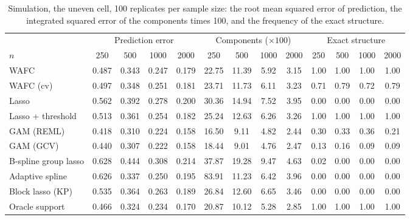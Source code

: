 \begin{table}[tp]
\color{colR1}
\caption{Simulation, the uneven cell, 100 replicates per sample size: the root mean squared error of prediction, the integrated squared error of the components times 100, and the frequency of the exact structure.}
\label{tab:sim-sizes-uneven}
\centering
\footnotesize
\setlength{\tabcolsep}{3pt}
\begin{tabular}{l cccc cccc cccc}
\hline
 & \multicolumn{4}{c}{Prediction error} & \multicolumn{4}{c}{Components ($\times 100$)} & \multicolumn{4}{c}{Exact structure} \\
$n$ & 250 & 500 & 1000 & 2000 & 250 & 500 & 1000 & 2000 & 250 & 500 & 1000 & 2000 \\
\hline
WAFC & 0.487 & 0.343 & 0.247 & 0.179 & 22.75 & 11.39 & 5.92 & 3.15 & 1.00 & 1.00 & 1.00 & 1.00 \\
WAFC (cv) & 0.497 & 0.348 & 0.251 & 0.181 & 23.71 & 11.73 & 6.11 & 3.23 & 0.71 & 0.79 & 0.72 & 0.79 \\
Lasso & 0.562 & 0.392 & 0.278 & 0.200 & 30.36 & 14.94 & 7.52 & 3.95 & 0.00 & 0.00 & 0.00 & 0.00 \\
Lasso + threshold & 0.513 & 0.361 & 0.254 & 0.182 & 25.24 & 12.63 & 6.26 & 3.26 & 1.00 & 1.00 & 1.00 & 1.00 \\
GAM (REML) & 0.418 & 0.310 & 0.224 & 0.158 & 16.50 & 9.11 & 4.82 & 2.44 & 0.30 & 0.33 & 0.36 & 0.21 \\
GAM (GCV) & 0.440 & 0.307 & 0.222 & 0.158 & 18.44 & 9.01 & 4.76 & 2.47 & 0.13 & 0.16 & 0.09 & 0.09 \\
B-spline group lasso & 0.628 & 0.444 & 0.308 & 0.214 & 37.87 & 19.28 & 9.47 & 4.63 & 0.02 & 0.00 & 0.00 & 0.00 \\
Adaptive spline & 0.626 & 0.337 & 0.250 & 0.195 & 83.91 & 11.23 & 6.42 & 3.96 & 0.00 & 0.00 & 0.00 & 0.00 \\
Block lasso (KP) & 0.535 & 0.364 & 0.263 & 0.189 & 26.84 & 12.60 & 6.65 & 3.46 & 0.00 & 0.00 & 0.00 & 0.00 \\
Oracle support & 0.466 & 0.324 & 0.234 & 0.170 & 20.87 & 10.12 & 5.28 & 2.85 & 1.00 & 1.00 & 1.00 & 1.00 \\
\hline
\end{tabular}
\end{table}

